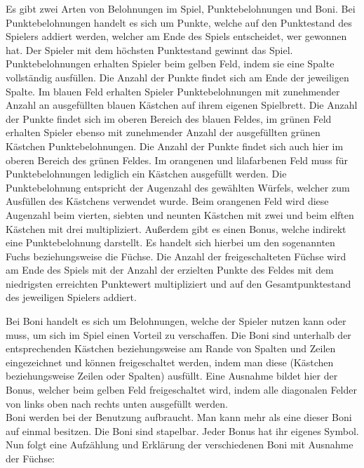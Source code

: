 Es gibt zwei Arten von Belohnungen im Spiel, Punktebelohnungen und Boni. Bei Punktebelohnungen handelt es sich um Punkte, welche auf den Punktestand des Spielers addiert werden, welcher am Ende des Spiels entscheidet, wer gewonnen hat. Der Spieler mit dem höchsten Punktestand gewinnt das Spiel. Punktebelohnungen erhalten Spieler beim gelben Feld, indem sie eine Spalte vollständig ausfüllen. Die Anzahl der Punkte findet sich am Ende der jeweiligen Spalte. Im blauen Feld erhalten Spieler Punktebelohnungen mit zunehmender Anzahl an ausgefüllten blauen Kästchen auf ihrem eigenen Spielbrett. Die Anzahl der Punkte findet sich im oberen Bereich des blauen Feldes, im grünen Feld erhalten Spieler ebenso mit zunehmender Anzahl der ausgefüllten grünen Kästchen Punktebelohnungen. Die Anzahl der Punkte findet sich auch hier im oberen Bereich des grünen Feldes. Im orangenen und lilafarbenen Feld muss für Punktebelohnungen lediglich ein Kästchen ausgefüllt werden. Die Punktebelohnung entspricht der Augenzahl des gewählten Würfels, welcher zum Ausfüllen des Kästchens verwendet wurde. Beim orangenen Feld wird diese Augenzahl beim vierten, siebten und neunten Kästchen mit zwei und beim elften Kästchen mit drei multipliziert. Außerdem gibt es einen Bonus, welche indirekt eine Punktebelohnung darstellt. Es handelt sich hierbei um den sogenannten Fuchs beziehungsweise die Füchse. Die Anzahl der freigeschalteten Füchse wird am Ende des Spiels mit der Anzahl der erzielten Punkte des Feldes mit dem niedrigsten erreichten Punktewert multipliziert und auf den Gesamtpunktestand des jeweiligen Spielers addiert.

Bei Boni handelt es sich um Belohnungen, welche der Spieler nutzen kann oder muss, um sich im Spiel einen Vorteil zu verschaffen. Die Boni sind unterhalb der entsprechenden Kästchen beziehungsweise am Rande von Spalten und Zeilen eingezeichnet und können freigeschaltet werden, indem man diese (Kästchen beziehungsweise Zeilen oder Spalten) ausfüllt. Eine Ausnahme bildet hier der Bonus, welcher beim gelben Feld freigeschaltet wird, indem alle diagonalen Felder von links oben nach rechts unten ausgefüllt werden. \\

Boni werden bei der Benutzung aufbraucht. Man kann mehr als eine dieser Boni auf einmal besitzen. Die Boni sind stapelbar. Jeder Bonus hat ihr eigenes Symbol. Nun folgt eine Aufzählung und Erklärung der verschiedenen Boni mit Ausnahme der Füchse:

